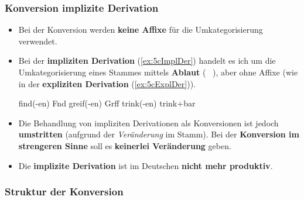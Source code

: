 \begin{frame}
\frametitle{Konversion \vs implizite Derivation}

\begin{itemize}
\item Bei der Konversion werden \textbf{keine Affixe} für die Umkategorisierung verwendet.

\item Bei der \textbf{impliziten Derivation} (\ref{ex:5cImplDer}) handelt es ich um die Umkategorisierung eines Stammes mittels \textbf{Ablaut} (\zB\ \textipa{[I]} \ras \textipa{[U]}), aber ohne Affixe (wie in der \textbf{expliziten Derivation} (\ref{ex:5cExplDer})).

\ea \label{ex:5cImplDer}
\ea {}find(-en) \ras {}Fnd
\ex {}greif(-en) \ras {}Grff
\z 
\ex \label{ex:5cExplDer} trink(-en) \ras {}trink$+$bar	
\z 

\item Die Behandlung von impliziten Derivationen als Konversionen ist jedoch \textbf{umstritten} (aufgrund der \emph{Veränderung} im Stamm). Bei der \textbf{Konversion im strengeren Sinne} soll es \textbf{keinerlei Veränderung} geben.

\item Die \textbf{implizite Derivation} ist im Deutschen \textbf{nicht mehr produktiv}.
\end{itemize}

\end{frame}


\subsubsection{Struktur der Konversion}


